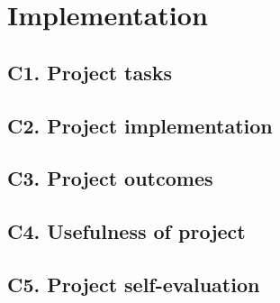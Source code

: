 \chapter*{\centering Implementation}\label{ch:impelentation}


\section*{C1. Project tasks}\label{sec:project-tasks}



\section*{C2. Project implementation}\label{sec:project-implementation}



\section*{C3. Project outcomes}\label{sec:project-outcomes}



\section*{C4. Usefulness of project}\label{sec:usefulness-of-project}



\section*{C5. Project self-evaluation}\label{sec:project-self-evaluation}

